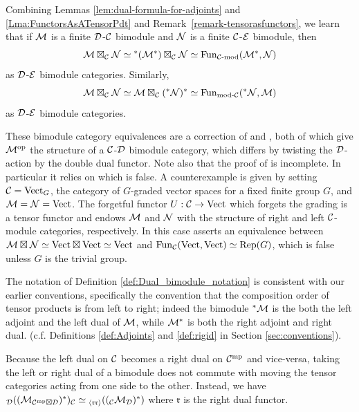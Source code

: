 \documentclass{amsart}
\begin{document}
\begin{remark} \label{rmk:Deligne_pdt_as_mod_functor}
Combining Lemmas \ref{lem:dual-formula-for-adjoints} and \ref{Lma:FunctorsAsATensorPdt} and Remark~\ref{remark-tensorasfunctors}, we learn that if $\mathcal M$ is a finite $\mathcal D$-$\mathcal C$ bimodule and $\mathcal N$ is a finite $\mathcal C$-$\mathcal E$ bimodule, then 
\begin{equation*}
	\mathcal M \boxtimes_\mathcal C \mathcal N \simeq {}^*(\mathcal M^*) \boxtimes_\mathcal C \mathcal N \simeq \operatorname{Fun}_{\mathcal C\text{-mod}}(\mathcal M^*,\mathcal N)
\end{equation*}
as $\mathcal D$-$\mathcal E$ bimodule categories.   Similarly, 
\begin{equation*}
	\mathcal M \boxtimes_{\mathcal C} \mathcal N \simeq \mathcal M \boxtimes_\mathcal C ({}^*\mathcal N)^* \simeq \operatorname{Fun}_{\text{mod-}\mathcal C}({}^*\mathcal N,\mathcal M)
\end{equation*}
as $\mathcal D$-$\mathcal E$ bimodule categories. 

	 These bimodule category equivalences are a correction of \cite[Remark 3.6]{0909.3140} and \cite[Thm. 3.20]{0911.4979}, both of which give $\mathcal M^{\mathrm{op}}$ the structure of a $\mathcal C$-$\mathcal D$ bimodule category, which differs by twisting the $\mathcal D$-action by the double dual functor. Note also that the proof of \cite[Thm. 3.20]{0911.4979} is incomplete. In particular it relies on \cite[Lma. 3.21]{0911.4979} which is false. A counterexample is given by setting $\mathcal C = \mathrm{Vect}_G$, the category of $G$-graded vector spaces for a fixed finite group $G$, and $\mathcal M = \mathcal N = \mathrm{Vect}$. The forgetful functor $U:\mathcal C \to \mathrm{Vect}$ which forgets the grading is a tensor functor and endows $\mathcal M$ and $\mathcal N$ with the structure of right and left $\mathcal C$-module categories, respectively. In this case \cite[Lma. 3.21]{0911.4979} asserts an equivalence between $\mathcal M \boxtimes \mathcal N \simeq \mathrm{Vect} \boxtimes \mathrm{Vect} \simeq \mathrm{Vect}$ and $\operatorname{Fun}_\mathcal C(\mathrm{Vect}, \mathrm{Vect}) \simeq \mathrm{Rep}(G)$, which is false unless $G$ is the trivial group.
\end{remark}

\begin{remark}
	The notation of Definition \ref{def:Dual_bimodule_notation} is consistent with our earlier conventions, specifically the convention that the composition order of tensor products is from left to right; indeed the bimodule ${}^*\mathcal M$ is the both the left adjoint and the left dual of $\mathcal M$, while $\mathcal M^*$ is both the right adjoint and right dual. (c.f. Definitions \ref{def:Adjoints} and \ref{def:rigid} in Section \ref{sec:conventions}). 
\end{remark}

\begin{warning}
Because the left dual on $\mathcal C$ becomes a right dual on $\mathcal C^{\mathrm{mp}}$ and vice-versa, taking the left or right dual of a bimodule does not commute with moving the tensor categories acting from one side to the other.  Instead, we have ${}_\mathcal D ((\mathcal M_{\mathcal C^{\mathrm{mp}} \boxtimes \mathcal D})^*)_\mathcal C \simeq {}_{\langle \mathfrak{r r} \rangle}(({}_\mathcal C \mathcal M_\mathcal D)^*)$ where $\mathfrak{r}$ is the right dual functor.%
\end{warning}
\end{document}
